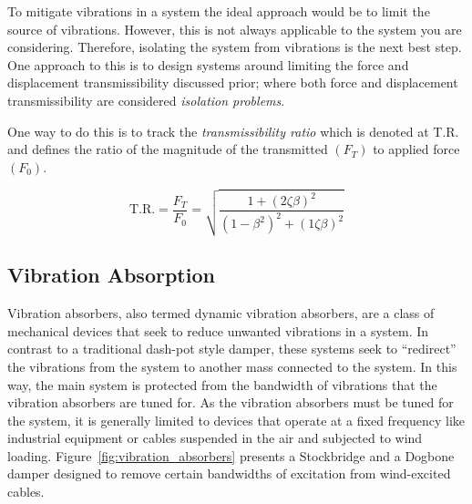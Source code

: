 \documentclass[12pt,letter]{article}
\begin{document}
To mitigate vibrations in a system the ideal approach would be to limit the source of vibrations. However, this is not always applicable to the system you are considering. Therefore, isolating the system from vibrations is the next best step. One approach to this is to design systems around limiting the force and displacement transmissibility discussed prior; where both force and displacement transmissibility are considered \emph{isolation problems}.

One way to do this is to track the \emph{transmissibility ratio} which is denoted at T.R. and defines the ratio of the magnitude of the transmitted $(F_T)$ to applied force $(F_0)$. 

\begin{equation}
	\text{T.R.} = \frac{F_T}{F_0} = \sqrt{\frac{1+(2 \zeta \beta )^2}{(1-\beta^2)^2+(1 \zeta \beta )^2}}
\end{equation}



\subsection{Vibration Absorption}

Vibration absorbers, also termed dynamic vibration absorbers, are a class of mechanical devices that seek to reduce unwanted vibrations in a system. In contrast to a traditional dash-pot style damper, these systems seek to ``redirect'' the vibrations from the system to another mass connected to the system. In this way, the main system is protected from the bandwidth of vibrations that the vibration absorbers are tuned for. As the vibration absorbers must be tuned for the system, it is generally limited to devices that operate at a fixed frequency like industrial equipment or cables suspended in the air and subjected to wind loading. Figure~\ref{fig:vibration_absorbers} presents a Stockbridge and a Dogbone damper designed to remove certain bandwidths of excitation from wind-excited cables.
\end{document}

